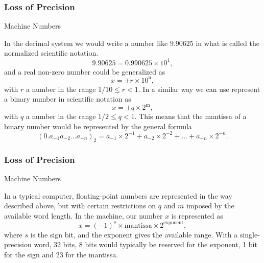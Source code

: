 \documentclass[compress]{beamer}
\begin{document}
\frame
{
  \frametitle{Loss of Precision}
  \begin{block}{Machine Numbers}
\begin{small}
{\scriptsize
In the decimal system we would write a number like $9.90625$
in what is called the normalized scientific notation.
\[
  9.90625=0.990625\times 10^{1},
\]
and a real non-zero number could be generalized as
\begin{equation}
    x=\pm r\times 10^{{\mathrm{n}}},
\end{equation}
with $r$ a number in the range $1/10 \le r < 1$.
In a similar way we can use represent a binary number in
scientific notation as
\begin{equation}
    x=\pm q\times 2^{{\mathrm{m}}},
\end{equation}
with $q$ a number in the range $1/2 \le q < 1$.
This means that the mantissa of a binary number would be represented by
the general formula
\begin{equation}
(0.a_{-1}a_{-2}\dots a_{-n})_2=a_{-1}\times 2^{-1}
+a_{-2}\times 2^{-2}+\dots+a_{-n}\times 2^{-n}.
\end{equation}
}
\end{small}
  \end{block}
}


\frame
{
  \frametitle{Loss of Precision}
  \begin{block}{Machine Numbers}
\begin{small}
{\scriptsize


In a typical computer, floating-point numbers are represented
in the way described above, but with certain restrictions
on $q$ and $m$ imposed by the available word length.
In the machine, our
number $x$ is represented as
%
\begin{equation}
    x=(-1)^s\times {\mathrm{mantissa}}\times 2^{{\mathrm{exponent}}},
\end{equation}
%
where $s$ is the sign bit, and the exponent gives the available range.
With a single-precision word, 32 bits, 8 bits would typically be reserved
for the exponent,  1 bit for the sign and 23 for the mantissa.
}
\end{small}
  \end{block}
}
\end{document}
